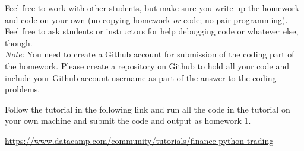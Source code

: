 \documentclass[12pt,letterpaper]{pset}
\begin{document}
Feel free to work with other students, but make sure you write up the homework
and code on your own (no copying homework \textit{or} code; no pair programming).
Feel free to ask students or instructors for help debugging code or whatever else,
though.\\

\textit{Note:} You need to create a Github account for submission of the coding
part of the homework. Please create a repository on Github to hold all your
code and include your Github account username as part of the answer to the
coding problems.

\begin{problem}[1]
  Follow the tutorial in the following link and run all the code in the
  tutorial on your own machine and submit the code and output as homework 1.

  \url{https://www.datacamp.com/community/tutorials/finance-python-trading}
\end{problem}

\begin{solution}
    \vfill
\end{solution}

\newpage
\end{document}
